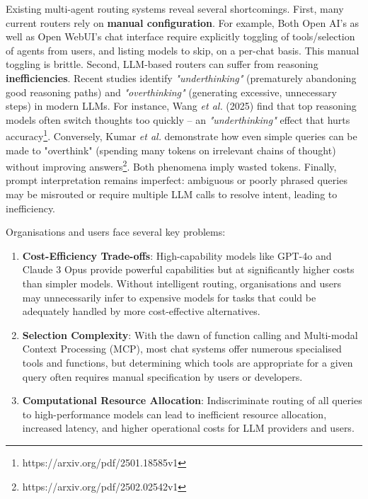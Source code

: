 Existing multi-agent routing systems reveal several shortcomings. First, many current routers rely on \textbf{manual configuration}. For example, Both Open AI's as well as Open WebUI's chat interface require explicitly toggling of tools/selection of agents from users, and listing models to skip, on a per-chat basis. This manual toggling is brittle. Second, LLM-based routers can suffer from reasoning \textbf{inefficiencies}. Recent studies identify \textit{"underthinking"} (prematurely abandoning good reasoning paths) and \textit{"overthinking"} (generating excessive, unnecessary steps) in modern LLMs. For instance, Wang \textit{et al.} (2025) find that top reasoning models often switch thoughts too quickly – an \textit{"underthinking"} effect that hurts accuracy\footnote{https://arxiv.org/pdf/2501.18585v1}. Conversely, Kumar \textit{et al.} demonstrate how even simple queries can be made to "overthink" (spending many tokens on irrelevant chains of thought) without improving answers\footnote{https://arxiv.org/pdf/2502.02542v1}. Both phenomena imply wasted tokens. Finally, prompt interpretation remains imperfect: ambiguous or poorly phrased queries may be misrouted or require multiple LLM calls to resolve intent, leading to inefficiency.

Organisations and users face several key problems:
\begin{enumerate}
    \item \textbf{Cost-Efficiency Trade-offs}: High-capability models like GPT-4o and Claude 3 Opus provide powerful capabilities but at significantly higher costs than simpler models. Without intelligent routing, organisations and users may unnecessarily infer to expensive models for tasks that could be adequately handled by more cost-effective alternatives.
    
    \item \textbf{Selection Complexity}: With the dawn of function calling and Multi-modal Context Processing (MCP), most chat systems offer numerous specialised tools and functions, but determining which tools are appropriate for a given query often requires manual specification by users or developers.
    
    \item \textbf{Computational Resource Allocation}: Indiscriminate routing of all queries to high-performance models can lead to inefficient resource allocation, increased latency, and higher operational costs for LLM providers and users.
\end{enumerate}

